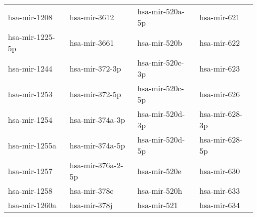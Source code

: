 \begin{table}[h]
\begin{tabular}{|l|l|l|l|}
  hsa-mir-1208 & hsa-mir-3612 & hsa-mir-520a-5p & hsa-mir-621 \\ 
  hsa-mir-1225-5p & hsa-mir-3661 & hsa-mir-520b & hsa-mir-622 \\ 
  hsa-mir-1244 & hsa-mir-372-3p & hsa-mir-520c-3p & hsa-mir-623 \\ 
  hsa-mir-1253 & hsa-mir-372-5p & hsa-mir-520c-5p & hsa-mir-626 \\ 
  hsa-mir-1254 & hsa-mir-374a-3p & hsa-mir-520d-3p & hsa-mir-628-3p \\ 
  hsa-mir-1255a & hsa-mir-374a-5p & hsa-mir-520d-5p & hsa-mir-628-5p \\ 
  hsa-mir-1257 & hsa-mir-376a-2-5p & hsa-mir-520e & hsa-mir-630 \\ 
  hsa-mir-1258 & hsa-mir-378e & hsa-mir-520h & hsa-mir-633 \\ 
  hsa-mir-1260a & hsa-mir-378j & hsa-mir-521 & hsa-mir-634 \\ 
   \hline
\end{tabular}
\vfill
\end{table}

